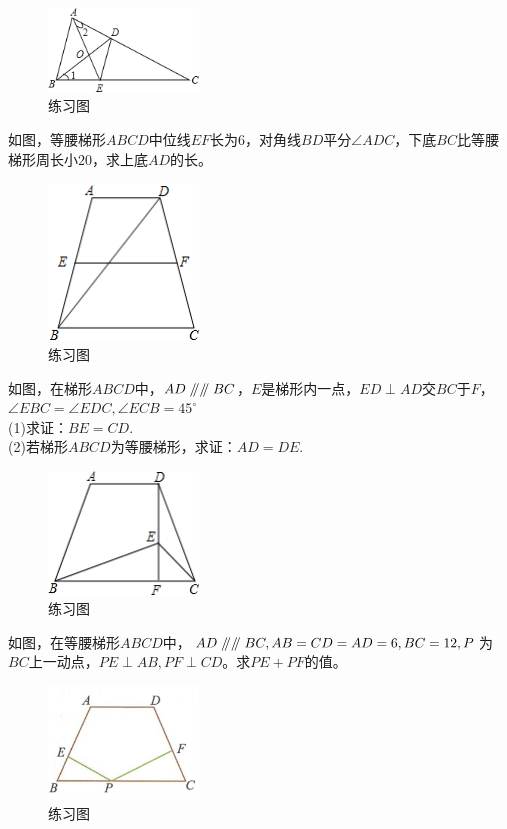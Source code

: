 \documentclass{ecnuthesis}
\newcommand\px{\mathrel{/\mkern-5mu/}}  %
\begin{document}
\begin{figure}[H]
\centering
\includegraphics[width=4cm]{picture/662.png}
\caption{练习图}
\end{figure}
\begin{problem}
    如图，等腰梯形$ABCD$中位线$EF$长为6，对角线$BD$平分$\angle ADC$，下底$BC$比等腰梯形周长小$20$，求上底$AD$的长。
\end{problem}
\begin{figure}[H]
\centering
\includegraphics[width=4cm]{picture/6117.png}
\caption{练习图}
\end{figure}
\begin{problem}
    如图，在梯形$ABCD$中，$AD\px\px BC$，$E$是梯形内一点，$ED\perp AD$交$BC$于$F$，$\angle EBC=\angle EDC,\angle ECB=45^\circ$ \\
    (1)求证：$BE=CD$.\\
    (2)若梯形$ABCD$为等腰梯形，求证：$AD=DE$. \\
\end{problem}
\begin{figure}[H]
\centering
\includegraphics[width=4cm]{picture/663.png}
\caption{练习图}
\end{figure}
\begin{problem}
    如图，在等腰梯形$ABCD$中，$AD\px\px BC,AB=CD=AD=6,BC=12,P$为$BC$上一动点，$PE\perp AB,PF\perp CD$。求$PE+PF$的值。
\end{problem}
\begin{figure}[H]
\centering
\includegraphics[width=4cm]{picture/664.png}
\caption{练习图}
\end{figure}
\clearpage
\end{document}
